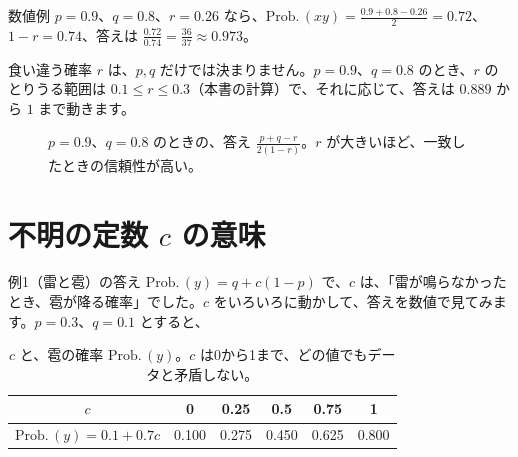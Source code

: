 \documentclass[a4paper,11pt,openany]{ltjsbook}
\newcommand{\Prob}{\mathrm{Prob.}\,}
\begin{document}
\begin{examplebox}{数値例}
$p=0.9$、$q=0.8$、$r=0.26$ なら、$\Prob(xy)=\tfrac{0.9+0.8-0.26}{2}=0.72$、$1-r=0.74$、答えは $\tfrac{0.72}{0.74}=\tfrac{36}{37}\approx0.973$。
\end{examplebox}

食い違う確率 $r$ は、$p,q$ だけでは決まりません。$p=0.9$、$q=0.8$ のとき、$r$ のとりうる範囲は $0.1\le r\le0.3$（本書の計算）で、それに応じて、答えは $0.889$ から $1$ まで動きます。

\begin{figure}[htbp]
\centering
{}
\caption{$p=0.9$、$q=0.8$ のときの、答え $\tfrac{p+q-r}{2(1-r)}$。$r$ が大きいほど、一致したときの信頼性が高い。}
\end{figure}

\section{不明の定数 $c$ の意味}

例1（雷と雹）の答え $\Prob(y)=q+c(1-p)$ で、$c$ は、「雷が鳴らなかったとき、雹が降る確率」でした。$c$ をいろいろに動かして、答えを数値で見てみます。$p=0.3$、$q=0.1$ とすると、

\begin{table}[htbp]
\centering
\begin{tabular}{c|ccccc}
\toprule
$c$ & 0 & 0.25 & 0.5 & 0.75 & 1\\
\midrule
$\Prob(y)=0.1+0.7c$ & 0.100 & 0.275 & 0.450 & 0.625 & 0.800\\
\bottomrule
\end{tabular}
\caption{$c$ と、雹の確率 $\Prob(y)$。$c$ は0から1まで、どの値でもデータと矛盾しない。}
\end{table}
\end{document}
